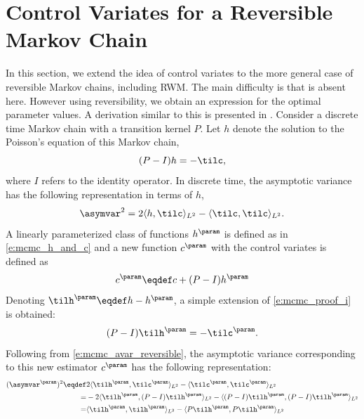 \section{Control Variates for a Reversible Markov Chain} 
\label{s:mcmc_reversible_mc_cv}
In this section, we extend the idea of control variates to the more general case of reversible Markov chains, including RWM. The main difficulty is that  is absent here. However using reversibility, we obtain an expression for the optimal parameter values. A derivation similar to this is presented in \cite{delkon12}.
Consider a discrete time Markov chain with a transition kernel $P$.  Let $h$ denote the solution to the Poisson's equation of this Markov chain,
\[
(P - I) h = -\tilc,
\]
where $I$ refers to the identity operator.
In discrete time, the asymptotic variance has the following representation in terms of $h$,
\begin{equation}
\asymvar^2 = 2 \langle h, \tilc \rangle_{L^2} - \langle \tilc, \tilc \rangle_{L^2}.
\label{e:mcmc_avar_reversible}
\end{equation}
A linearly parameterized class of functions $h^\param$ is defined as in \eqref{e:mcmc_h_and_c} and a new function $c^\param$ with the control variates is defined as
\begin{equation}
c^\param \eqdef c +  (P - I) h^\param
\label{e:mcmc_discrete_cv}
\end{equation}
Denoting $\tilh^\param \eqdef h - h^\param$, a simple extension of \eqref{e:mcmc_proof_i} is obtained:
\begin{equation}
(P - I) \tilh^\param = -\tilc^\param.
\label{e:mcmc_discrete_poissons_cv}
\end{equation}
Following from \eqref{e:mcmc_avar_reversible}, the asymptotic variance corresponding to this new estimator $c^\param$ has the following representation:
\begin{equation}
\begin{aligned}
(\asymvar^\param)^2 \eqdef & 2 \langle \tilh^\param, \tilc^\param \rangle_{L^2} - \langle \tilc^\param, \tilc^\param \rangle_{L^2}\\
= &  - 2 \langle \tilh^\param, (P - I) \tilh^\param \rangle_{L^2} -\langle (P - I) \tilh^\param, (P - I) \tilh^\param \rangle_{L^2}\\
= & \langle \tilh^\param, \tilh^\param \rangle_{L^2} - \langle P \tilh^\param, P \tilh^\param \rangle_{L^2}
\label{e:mcmc_asym_var_theta_discrete}
\end{aligned}
\end{equation}
